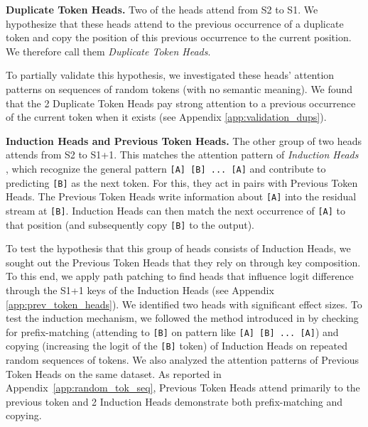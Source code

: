 \textbf{Duplicate Token Heads.} Two of the heads attend from S2 to S1. We hypothesize that these heads attend to the previous occurrence of a duplicate token and copy the position of this previous occurrence to the current position. We therefore call them \emph{Duplicate Token Heads}.


To partially validate this hypothesis, we investigated these heads' attention patterns %
on sequences of random tokens (with no semantic meaning). We found that the 2 Duplicate Token Heads pay strong attention to a previous occurrence of the current token when it exists (see Appendix \ref{app:validation_dups}). 
%




\textbf{Induction Heads and Previous Token Heads.} The other group of two heads attends from S2 to S1+1. This matches the attention pattern of \emph{Induction Heads} \citep{elhage2021mathematical}, which recognize the general pattern \texttt{[A]\,[B]\,...\,[A]} and contribute to predicting \texttt{[B]} as the next token. For this, they act in pairs with Previous Token Heads. The Previous Token Heads write information about \texttt{[A]} into the residual stream at \texttt{[B]}. Induction Heads can then match the next occurrence of \texttt{[A]} to that position (and subsequently copy \texttt{[B]} to the output).

To test the hypothesis that this group of heads consists of Induction Heads, we sought out the Previous Token Heads that they rely on through key composition. To this end, we apply path patching to find heads that influence logit difference through the S1+1 keys of the Induction Heads (see Appendix \ref{app:prev_token_heads}). We identified two heads with significant effect sizes. 
To test the induction mechanism, we followed the method introduced in \citet{olsson2022context} by checking for prefix-matching (attending to \texttt{[B]} on pattern like \texttt{[A]\,[B]\,...\,[A]}) and copying (increasing the logit of the \texttt{[B]} token) of Induction Heads on repeated random sequences of tokens. We also analyzed the attention patterns of Previous Token Heads on the same dataset. As reported in Appendix~\ref{app:random_tok_seq}, Previous Token Heads attend primarily to the previous token and 2 Induction Heads demonstrate both prefix-matching and copying.


